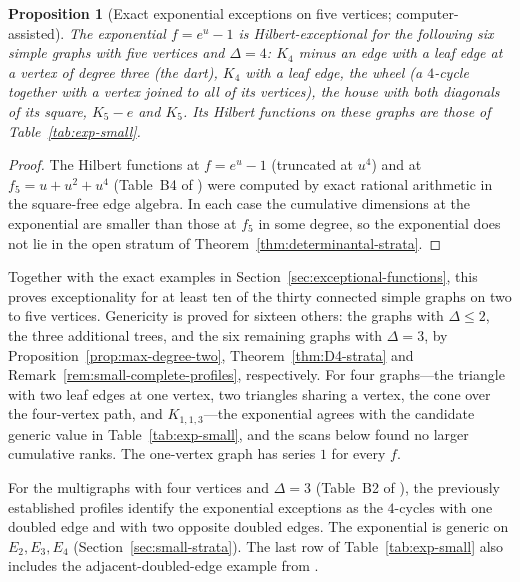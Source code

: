 \documentclass[reqno]{article}
\theoremstyle{plain} %
\newtheorem{proposition}[theorem]{Proposition}
\theoremstyle{definition}
\theoremstyle{remark}
\numberwithin{equation}{section}
\begin{document}
\begin{proposition}[Exact exponential exceptions on five vertices; computer-assisted]
\label{prop:exp-small}
The exponential $f=e^u-1$ is Hilbert-exceptional for the following six
simple graphs with five vertices and $\Delta=4$: $K_4$ minus an edge
with a leaf edge at a vertex of degree three (the dart), $K_4$ with a
leaf edge, the wheel (a $4$-cycle together with a vertex joined to all
of its vertices), the house with both diagonals of its square, $K_5-e$
and $K_5$. Its Hilbert functions on these graphs are those of
Table~\ref{tab:exp-small}.
\end{proposition}
\begin{proof}
The Hilbert functions at $f=e^u-1$ (truncated at $u^4$) and at
$f_5=u+u^2+u^4$ (Table~B4 of \cite[\texttt{tables/}]{Cert}) were computed by exact rational
arithmetic in the square-free edge algebra. In each case the cumulative
dimensions at the exponential are smaller than those at $f_5$ in some
degree, so the exponential does not lie in the open stratum of
Theorem~\ref{thm:determinantal-strata}.
\end{proof}

Together with the exact examples in
Section~\ref{sec:exceptional-functions}, this proves exceptionality for
at least ten of the thirty connected simple graphs on two to five
vertices. Genericity is proved for sixteen others: the graphs with
$\Delta\le2$, the three additional trees, and the six remaining graphs
with $\Delta=3$, by Proposition~\ref{prop:max-degree-two},
Theorem~\ref{thm:D4-strata} and
Remark~\ref{rem:small-complete-profiles}, respectively.
For four graphs---the triangle with two leaf edges at one vertex,
two triangles sharing a vertex, the cone over the four-vertex path, and $K_{1,1,3}$---the
exponential agrees with the candidate generic value in
Table~\ref{tab:exp-small}, and the scans below found no larger cumulative
ranks. The one-vertex graph has series $1$ for every $f$.

For the multigraphs with four vertices and $\Delta=3$ (Table~B2
of \cite[\texttt{tables/}]{Cert}), the previously
established profiles identify the exponential exceptions as the
$4$-cycles with one doubled edge and with two opposite doubled edges.
The exponential is generic on $E_2,E_3,E_4$
(Section~\ref{sec:small-strata}). The last row of
Table~\ref{tab:exp-small} also includes the adjacent-doubled-edge example
from \cite[Example~2]{NSh}.
\end{document}
